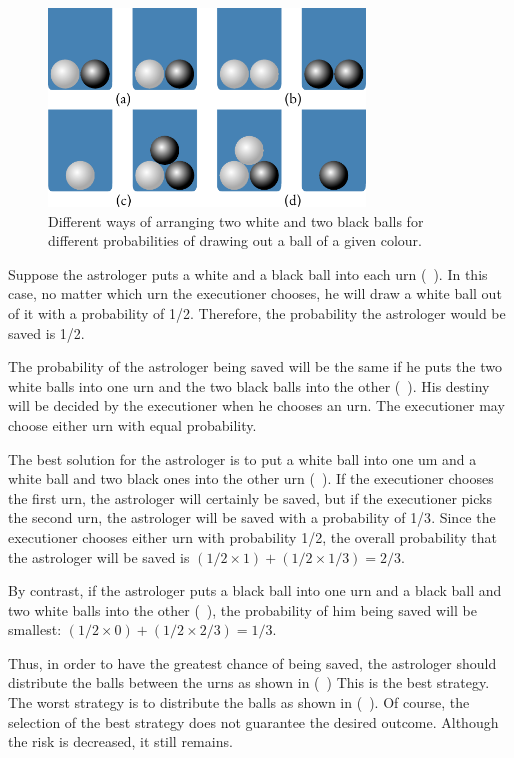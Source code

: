 \begin{figure}[!ht]
 \centering
 \includegraphics[width=0.75\textwidth]{figures/ball-picking.pdf}
\caption{Different ways of arranging two white and two black balls for
  different probabilities of drawing out a ball of a given colour.\label{ball-picking}}
 \end{figure}

Suppose the astrologer puts a white and a black ball into each urn
(~). In this case, no matter which urn the executioner chooses, he will draw a white ball out of it with a probability of 1/2. Therefore, the probability the astrologer would be saved is 1/2.

The probability of the astrologer being saved will be the same if he
puts the two white balls into one urn and the two black balls into the
other (~). His destiny will be decided by the executioner when he chooses an urn. The executioner may choose either urn with equal probability.

The best solution for the astrologer is to put a white ball into one um
and a white ball and two black ones into the other urn (~). If the executioner chooses the ﬁrst urn, the astrologer will certainly be saved, but if the executioner picks the second urn, the astrologer will be saved with a probability of {1/3}. Since the executioner chooses either urn with probability {1/2}, the overall probability that the astrologer will be saved is $(1/2 \times 1)+(1/2 \times 1/3)=2/3$.

By contrast, if the astrologer puts a black ball into one urn and
a black ball and two white balls into the other (~), the probability of him being saved will be smallest: $(1/2 \times 0)+(1/2 \times 2/3) = 1/3$.

Thus, in order to have the greatest chance of being saved, the
astrologer should distribute the balls between the urns as shown in
(~) This is the best strategy. The worst
strategy is to distribute the balls as shown in (~). Of course, the selection of the best strategy does not guarantee the desired outcome. Although the risk is decreased, it still remains.


